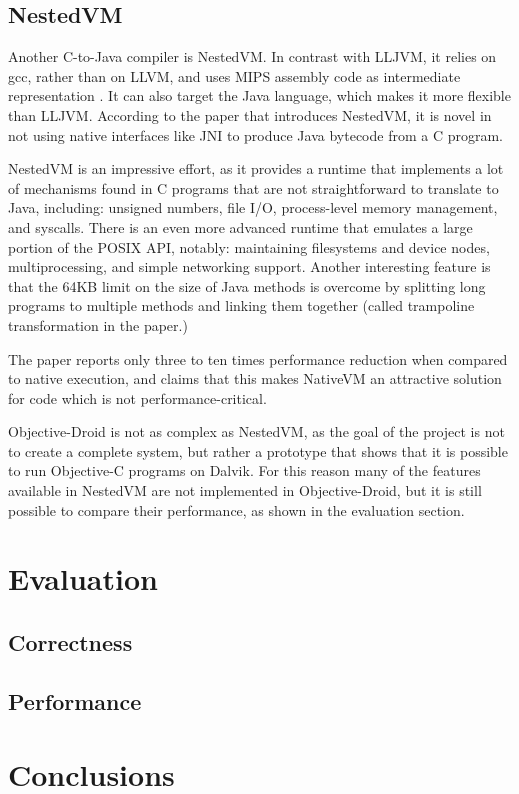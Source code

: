 \documentclass[parskip]{cs4rep}
\begin{document}
\section{NestedVM}

Another C-to-Java compiler is NestedVM. In contrast with LLJVM, it relies on gcc, rather than on LLVM, and uses MIPS assembly code as intermediate representation \cite{AllietMegacz:ivme:2004}. It can also target the Java language, which makes it more flexible than LLJVM. According to the paper that introduces NestedVM, it is novel in not using native interfaces like JNI to produce Java bytecode from a C program.

NestedVM is an impressive effort, as it provides a runtime that implements a lot of mechanisms found in C programs that are not straightforward to translate to Java, including: unsigned numbers, file I/O, process-level memory management, and syscalls. There is an even more advanced runtime that emulates a large portion of the POSIX API, notably: maintaining filesystems and device nodes, multiprocessing, and simple networking support. Another interesting feature is that the 64KB limit on the size of Java methods is overcome by splitting long programs to multiple methods and linking them together (called trampoline transformation in the paper.)

The paper reports only three to ten times performance reduction when compared to native execution, and claims that this makes NativeVM an attractive solution for code which is not performance-critical.

Objective-Droid is not as complex as NestedVM, as the goal of the project is not to create a complete system, but rather a prototype that shows that it is possible to run Objective-C programs on Dalvik. For this reason many of the features available in NestedVM are not implemented in Objective-Droid, but it is still possible to compare their performance, as shown in the evaluation section.

\chapter{Evaluation}

\section{Correctness}

\section{Performance}

\chapter{Conclusions}



\end{document}
